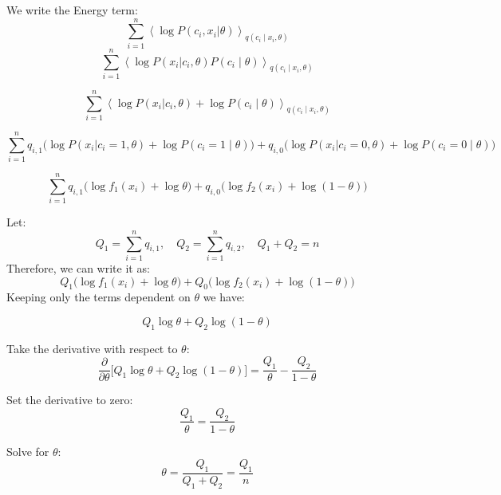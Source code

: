 \documentclass{article}
\begin{document}
We write the Energy term:
\[
\sum_{i=1}^n  \left\langle  \log P(c_i, x_i| \theta)\right\rangle _{q(c_i \mid x_i , \theta)}
\]
\[
\sum_{i=1}^n  \left\langle  \log P( x_i|c_i, \theta)P( c_i \mid \theta)\right\rangle _{q(c_i \mid x_i , \theta)}
\]

\[
\sum_{i=1}^n  \left\langle  
\log P( x_i|c_i, \theta) +
\log P( c_i \mid \theta)
\right\rangle _{q(c_i \mid x_i , \theta)}
\]

\[
\sum_{i=1}^n    
q_{i,1} \big (\log P( x_i|c_i=1, \theta) +
\log P( c_i =1\mid \theta)\big)+
q_{i,0} \big(\log P( x_i|c_i=0, \theta) +
\log P( c_i=0 \mid \theta) \big)
\]

\[
\sum_{i=1}^n    
q_{i,1} \big (\log f_1( x_i) +
\log  \theta \big)+
q_{i,0} \big(\log f_2( x_i) +
\log ( 1 - \theta) \big)
\]

Let:
\[
Q_1 = \sum_{i=1}^n q_{i,1}, \quad Q_2 = \sum_{i=1}^n q_{i,2}, \quad Q_1 + Q_2 = n
\]
Therefore, we can write it as:
\[
Q_{1} \big (\log f_1( x_i) +
\log  \theta \big)+
Q_{0} \big(\log f_2( x_i) +
\log ( 1 - \theta) \big)
\]
Keeping only the terms dependent on $\theta$ we have:

\[
 Q_1 \log \theta + Q_2 \log (1 - \theta)
\]

Take the derivative with respect to \( \theta \):
\[
\frac{\partial}{\partial \theta} \big[ Q_1 \log \theta + Q_2 \log (1 - \theta) \big] = \frac{Q_1}{\theta} - \frac{Q_2}{1 - \theta}
\]

Set the derivative to zero:
\[
\frac{Q_1}{\theta} = \frac{Q_2}{1 - \theta}
\]

Solve for \( \theta \):
\[
\theta = \frac{Q_1}{Q_1+Q_2} = \frac{Q_1}{n}
\]
\end{document}
